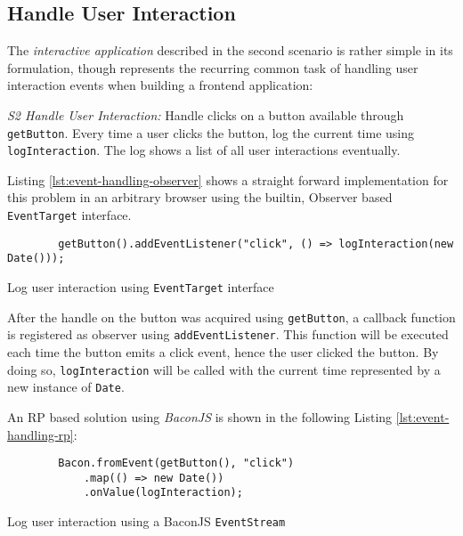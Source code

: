 \documentclass[12pt,a4paper]{article}
\begin{document}
\subsection{Handle User Interaction}

The \emph{interactive application} \cite{7827078} described in the second scenario is rather simple in its formulation, though represents the recurring common task of handling user interaction events when building a frontend application:

\begin{framed}
	\noindent\emph{S2 Handle User Interaction:} Handle clicks on a button available through \texttt{getButton}. Every time a user clicks the button, log the current time using \texttt{logInteraction}. The log shows a list of all user interactions eventually.
\end{framed}

Listing \ref{lst:event-handling-observer} shows a straight forward implementation for this problem in an arbitrary browser using the builtin, Observer based \texttt{EventTarget} interface.

\begin{listing}[H]
	\begin{verbatim}
		getButton().addEventListener("click", () => logInteraction(new Date()));
	\end{verbatim}
	\caption{Log user interaction using \texttt{EventTarget} interface}
	\label{lst:event-handling-observer}
\end{listing}

After the handle on the button was acquired using \texttt{getButton}, a callback function is registered as observer using \texttt{addEventListener}. This function will be executed each time the button emits a click event, hence the user clicked the button. By doing so, \texttt{logInteraction} will be called with the current time represented by a new instance of \texttt{Date}.

An RP based solution using \emph{BaconJS} is shown in the following Listing \ref{lst:event-handling-rp}:

\begin{listing}[H]
	\begin{verbatim}
		Bacon.fromEvent(getButton(), "click")
			.map(() => new Date())
			.onValue(logInteraction);
	\end{verbatim}
	\caption{Log user interaction using a BaconJS \texttt{EventStream}}
	\label{lst:event-handling-rp}
\end{listing}
\end{document}
